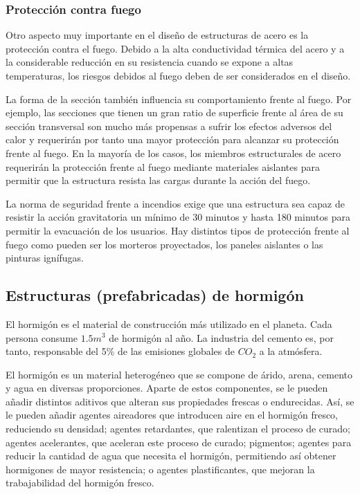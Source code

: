 \subsubsection*{Protección contra fuego}

Otro aspecto muy importante en el diseño de estructuras de acero es la protección contra el fuego. Debido a la alta conductividad térmica del acero y a la considerable reducción en su resistencia cuando se expone a altas temperaturas, los riesgos debidos al fuego deben de ser considerados en el diseño. 

La forma de la sección también influencia su comportamiento frente al fuego. Por ejemplo, las secciones que tienen un gran ratio de superficie frente al área de su sección transversal son mucho más propensas a sufrir los efectos adversos del calor y requerirán por tanto una mayor protección para alcanzar su protección frente al fuego. En la mayoría de los casos, los miembros estructurales de acero requerirán la protección frente al fuego mediante materiales aislantes para permitir que la estructura resista las cargas durante la acción del fuego.

La norma de seguridad frente a incendios exige que una estructura sea capaz de resistir la acción gravitatoria un mínimo de 30 minutos y hasta 180 minutos para permitir la evacuación de los usuarios. Hay distintos tipos de protección frente al fuego como pueden ser los morteros proyectados, los paneles aislantes o las pinturas ignífugas.

\subsection{Estructuras (prefabricadas) de hormigón}

El hormigón es el material de construcción más utilizado en el planeta. Cada persona consume $1.5 m^3$ de hormigón al año. La industria del cemento es, por tanto, responsable del 5\% de las emisiones globales de $CO_2$ a la atmósfera.

El hormigón es un material heterogéneo que se compone de árido, arena, cemento y agua en diversas proporciones. Aparte de estos componentes, se le pueden añadir distintos aditivos que alteran sus propiedades frescas o endurecidas. Así, se le pueden añadir agentes aireadores que introducen aire en el hormigón fresco, reduciendo su densidad; agentes retardantes, que ralentizan el proceso de curado; agentes acelerantes, que aceleran este proceso de curado; pigmentos; agentes para reducir la cantidad de agua que necesita el hormigón, permitiendo así obtener hormigones de mayor resistencia; o agentes plastificantes, que mejoran la trabajabilidad del hormigón fresco.


